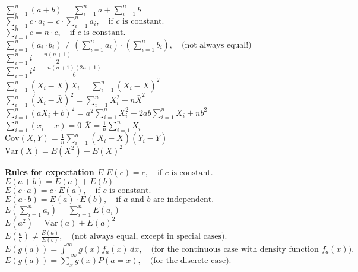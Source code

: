 \documentclass[a4paper,8pt,fleqn]{article}
\begin{document}
\begin{multicols}{3}
\begin{minipage}{\linewidth}
\(\sum_{i=1}^n (a + b) = \sum_{i=1}^n a + \sum_{i=1}^n b\) \\
\(\sum_{i=1}^n c \cdot a_i = c \cdot \sum_{i=1}^n a_i, \quad \text{if } c \text{ is constant.}\) \\
\(\sum_{i=1}^n c = n \cdot c, \quad \text{if } c \text{ is constant.}\) \\
\(\sum_{i=1}^n (a_i \cdot b_i) \neq \left( \sum_{i=1}^n a_i \right) \cdot \left( \sum_{i=1}^n b_i \right), \quad \text{(not always equal!)}\) \\
\(\sum_{i=1}^n i = \frac{n(n+1)}{2}\) \\
\(\sum_{i=1}^n i^2 = \frac{n(n+1)(2n+1)}{6}\) \\
\(\sum_{i=1}^n (X_i - \bar{X}) X_i = \sum_{i=1}^n (X_i - \bar{X})^2\) \\
\(\sum_{i=1}^n (X_i - \bar{X})^2 = \sum_{i=1}^n X_i^2 - n\bar{X}^2\) \\
\(\sum_{i=1}^n (a X_i + b)^2 = a^2 \sum_{i=1}^n X_i^2 + 2ab \sum_{i=1}^n X_i + nb^2\) \\
\(\sum_{i=1}^n (x_i - \bar{x}) = 0\)
\(\bar{X} = \frac{1}{n} \sum_{i=1}^n X_i\)
\(\text{Cov}(X, Y) = \frac{1}{n} \sum_{i=1}^n (X_i - \bar{X})(Y_i - \bar{Y})\) \\
\(\text{Var}(X) = E(X^2) - E(X)^2\) \\
\end{minipage}


\begin{minipage}{\linewidth}
\textbf{Rules for expectation \(E\)} 
\(E(c) = c, \quad \text{if } c \text{ is constant.}\) \\
\(E(a + b) = E(a) + E(b)\) \\
\(E(c \cdot a) = c \cdot E(a), \quad \text{if } c \text{ is constant.}\) \\
\(E(a \cdot b) = E(a) \cdot E(b), \quad \text{if } a \text{ and } b \text{ are independent.}\) \\
\(E\left( \sum_{i=1}^n a_i \right) = \sum_{i=1}^n E(a_i)\) \\
\(E(a^2) = \text{Var}(a) + E(a)^2\) \\
\(E\left(\frac{a}{b}\right) \neq \frac{E(a)}{E(b)}, \quad \text{(not always equal, except in special cases).}\) \\
\(E(g(a)) = \int_{-\infty}^\infty g(x) f_a(x) \, dx, \quad \text{(for the continuous case with density function } f_a(x)\text{).}\) \\
\(E(g(a)) = \sum_{x} g(x) P(a = x), \quad \text{(for the discrete case).}\)
\end{minipage}


\newpage



\end{multicols}
\end{document}
